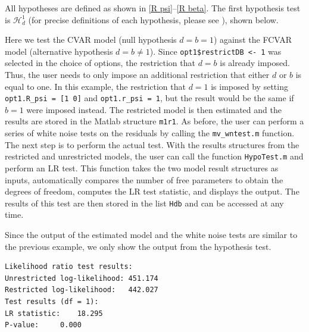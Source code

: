 \documentclass[article]{jss}
\begin{document}
All hypotheses are defined as shown in \eqref{R psi}--\eqref{R beta}. The first hypothesis test is $\mathscr{H}_d^1$ (for precise definitions of each hypothesis, please see \cite{JNP2014}), 
shown below. 


Here we test the CVAR model (null hypothesis $d=b=1$) against the FCVAR model (alternative hypothesis $d=b$). Since \verb|opt1$restrictDB <- 1| was selected in the choice of options,
the restriction that $d=b$ is already imposed. Thus, the user needs to only impose an additional restriction that either $d$ or $b$ is equal to one. In this example, the restriction that $d=1$ is imposed by setting \verb|opt1.R_psi = [1 0]| and \verb|opt1.r_psi = 1|, but the result would be the same if $b=1$ were imposed instead. The restricted model is then estimated and the results are stored in the Matlab structure \verb|m1r1|. As before, the user can perform a series of white noise tests on the residuals by calling the \verb|mv_wntest.m| function. The next step is to perform the actual test. With the results structures from the restricted and unrestricted models, the user can call the function \verb|HypoTest.m| and perform an LR test. This function takes the two model result structures as inputs, automatically compares the number of free parameters to obtain the degrees of freedom, computes the LR test statistic, and displays the output. The results of this test are then stored in the list \verb|Hdb| and can be accessed at any time.

Since the output of the estimated model and the white noise tests are similar to the previous example, we only show the output from the hypothesis test. 

\begin{verbatim}
Likelihood ratio test results:
Unrestricted log-likelihood: 451.174
Restricted log-likelihood:   442.027
Test results (df = 1):
LR statistic: 	 18.295
P-value: 	 0.000
\end{verbatim}
\end{document}
